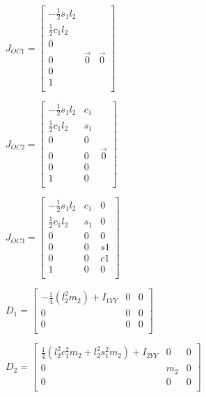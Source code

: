 
\begin{figure}[H]
\centering

$ J_{OC1}=
\begin{bmatrix}
-\frac{1}{2}s_1l_2    &  &\\
\frac{1}{2}c_1l_2  \\
0 & & \\
0 &\overrightarrow{0} &\overrightarrow{0} \\
0 & &\\
1 & &\\
\end{bmatrix}  
$
\end{figure} 

\begin{figure}[H]
\centering
$ J_{OC2}=
\begin{bmatrix}
-\frac{1}{2}s_1l_2    &c_1  &\\
\frac{1}{2}c_1l_2  & s_1\\
0 &0 & \\
0 &0 &\overrightarrow{0} \\
0 &0 &\\
1 &0 &\\
\end{bmatrix}  $
\end{figure} 


\begin{figure}[H]
\centering
$J_{OC3}=
\begin{bmatrix}
-\frac{1}{2}s_1l_2    &c_1  &0\\
\frac{1}{2}c_1l_2  & s_1&0\\
0 &0 &0 \\
0 &0 & s1\\
0 &0 &c1\\
1 &0 &0\\
\end{bmatrix}  
$
\end{figure}



\begin{figure}[H]
\centering
$D_1=
\begin{bmatrix}
-\frac{1}{4}(l_2^2m_2)+I_{1YY}    &0  &0\\
0& 0&0\\
0 &0 &0 \\
\end{bmatrix}  
$
\end{figure}


\begin{figure}[H]
\centering
$D_2=
\begin{bmatrix}
\frac{1}{4}(l_2^2c_1^2m_2+l_2^2s_1^2m_2)+I_{2YY}   &0  &0\\
0& m_2&0\\
0 &0 &0 \\
\end{bmatrix}  
$
\end{figure}


